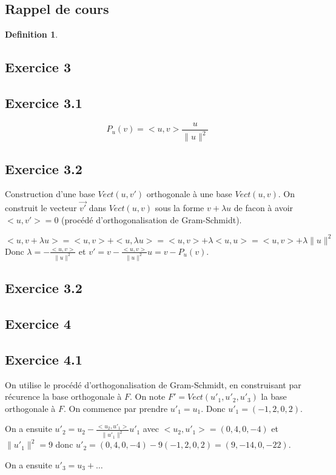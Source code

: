\documentclass[]{book}
\theoremstyle{definition}
\newtheorem{defn}{Definition}
\newcommand{\vect}[1]{\overrightarrow{#1}}
\begin{document}
\subsection*{Rappel de cours}
\begin{defn}
\end{defn}



\newpage
\subsection*{Exercice 3}
\subsection*{Exercice 3.1}
$$
P_u(v) = <u,v>\frac{u}{\lVert u\rVert^2}
$$

\subsection*{Exercice 3.2}
Construction d'une base $Vect(u,v')$ orthogonale \`a une base $Vect(u,v).$ On construit le vecteur $\vect{v'}$ dans $Vect(u, v)$ sous la forme $v+\lambda u$ de facon \`a avoir $<u,v'> = 0$ (proc\'ed\'e d’orthogonalisation
de Gram-Schmidt).

$$
<u,v+\lambda u> = <u,v> + <u,\lambda u> = <u,v> + \lambda<u,u> = <u,v> + \lambda\lVert u \rVert^2
$$
Donc $\lambda = -\frac{<u,v>}{\lVert u \rVert^2}$ et $v'= v -\frac{<u,v>}{\lVert u \rVert^2} u = v - P_u(v)$.

\subsection*{Exercice 3.2}


\subsection*{Exercice 4}
\subsection*{Exercice 4.1}
On utilise le proc\'ed\'e d’orthogonalisation de Gram-Schmidt, en construisant par r\'ecurence la base orthogonale \`a $F$. On note $F' = Vect(u'_1, u'_2, u'_3)$ la base orthogonale \`a $F$. On commence par prendre $u'_1 = u_1$. Donc $u'_1 = (-1, 2, 0, 2)$.


On a ensuite $u'_2 = u_2 - \frac{<u_2, u'_1>}{\lVert u'_1 \rVert^2}u'_1$  avec $<u_2, u'_1> = (0, 4, 0, -4)$ et $\lVert u'_1 \rVert^2 = 9$ donc $u'_2 = (0, 4, 0, -4) - 9 (-1, 2, 0, 2) = (9,-14, 0, -22)$.

On a ensuite $u'_3 = u_3 + \ldots$
\end{document}
